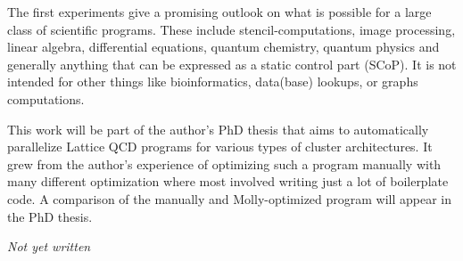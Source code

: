 \documentclass{sigplanconf}
\begin{document}
The first experiments give a promising outlook on what is possible for a large class of scientific programs. These include stencil-computations, image processing, linear algebra, differential equations, quantum chemistry, quantum physics and generally anything that can be expressed as a static control part (SCoP). It is not intended for other things like bioinformatics, data(base) lookups, or graphs computations.

This work will be part of the author's PhD thesis that aims to automatically parallelize Lattice QCD programs for various types of cluster architectures. It grew from the author's experience of optimizing such a program manually with many different optimization where most involved writing just a lot of boilerplate code. A comparison of the manually and Molly-optimized program will appear in the PhD thesis.


\acks

\emph{Not yet written}
\end{document}
